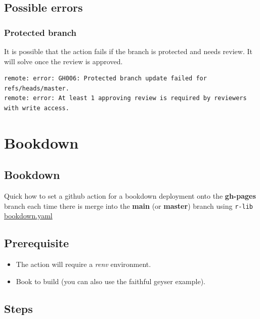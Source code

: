 \documentclass[
]{book}
\providecommand{\tightlist}{%
  \setlength{\itemsep}{0pt}\setlength{\parskip}{0pt}}
\begin{document}
\hypertarget{possible-errors}{%
\section{Possible errors}\label{possible-errors}}

\hypertarget{protected-branch}{%
\subsection{Protected branch}\label{protected-branch}}

It is possible that the action fails if the branch is protected and needs review. It will solve once the review is approved.

\begin{verbatim}
remote: error: GH006: Protected branch update failed for refs/heads/master.        
remote: error: At least 1 approving review is required by reviewers with write access. 
\end{verbatim}

\hypertarget{bookdown}{%
\chapter{Bookdown}\label{bookdown}}

\hypertarget{bookdown-1}{%
\section{Bookdown}\label{bookdown-1}}

Quick how to set a github action for a bookdown deployment onto the \textbf{gh-pages} branch each time there is merge into the \textbf{main} (or \textbf{master}) branch using \texttt{r-lib} \href{https://github.com/r-lib/actions/blob/v2-branch/examples/bookdown.yaml}{bookdown.yaml}

\hypertarget{prerequisite-3}{%
\section{Prerequisite}\label{prerequisite-3}}

\begin{itemize}
\tightlist
\item
  The action will require a \emph{renv} environment.
\item
  Book to build (you can also use the faithful geyser example).
\end{itemize}

\hypertarget{steps-3}{%
\section{Steps}\label{steps-3}}
\end{document}
